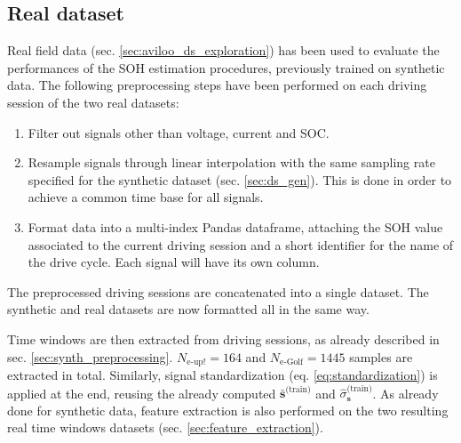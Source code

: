 \subsection{Real dataset}
\label{sec:aviloo_preprocessing}
Real field data (sec. \ref{sec:aviloo_ds_exploration}) has been used to evaluate the performances of the SOH estimation procedures, previously trained on synthetic data. The following preprocessing steps have been performed on each driving session of the two real datasets:
\begin{enumerate}
    \item Filter out signals other than voltage, current and SOC.
    \item Resample signals through linear interpolation with the same sampling rate specified for the synthetic dataset (sec. \ref{sec:ds_gen}). This is done in order to achieve a common time base for all signals.
    \item Format data into a multi-index Pandas dataframe, attaching the SOH value associated to the current driving session and a short identifier for the name of the drive cycle. Each signal will have its own column.
\end{enumerate}
The preprocessed driving sessions are concatenated into a single dataset. The synthetic and real datasets are now formatted all in the same way.

Time windows are then extracted from driving sessions, as already described in sec. \ref{sec:synth_preprocessing}. $N_\text{e-up!}=164$ and $N_\text{e-Golf}=1445$ samples are extracted in total. Similarly, signal standardization (eq. \ref{eq:standardization}) is applied at the end, reusing the already computed $\bar{\mathbf{s}}^\text{(train)}$ and $\hat{\sigma}_\mathbf{s}^\text{(train)}$. As already done for synthetic data, feature extraction is also performed on the two resulting real time windows datasets (sec. \ref{sec:feature_extraction}).

